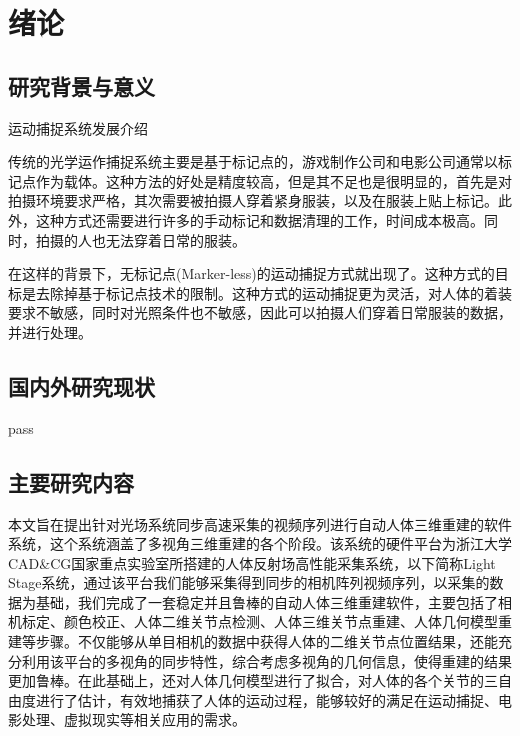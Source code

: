 
\section{绪论}

\subsection{研究背景与意义}
运动捕捉系统发展介绍

传统的光学运作捕捉系统主要是基于标记点的，游戏制作公司和电影公司通常以标记点作为载体。这种方法的好处是精度较高，但是其不足也是很明显的，首先是对拍摄环境要求严格，其次需要被拍摄人穿着紧身服装，以及在服装上贴上标记。此外，这种方式还需要进行许多的手动标记和数据清理的工作，时间成本极高。同时，拍摄的人也无法穿着日常的服装。

在这样的背景下，无标记点(Marker-less)的运动捕捉方式就出现了。这种方式的目标是去除掉基于标记点技术的限制。这种方式的运动捕捉更为灵活，对人体的着装要求不敏感，同时对光照条件也不敏感，因此可以拍摄人们穿着日常服装的数据，并进行处理。


\subsection{国内外研究现状}
pass

\subsection{主要研究内容}
本文旨在提出针对光场系统同步高速采集的视频序列进行自动人体三维重建的软件系统，这个系统涵盖了多视角三维重建的各个阶段。该系统的硬件平台为浙江大学CAD\&CG国家重点实验室所搭建的人体反射场高性能采集系统，以下简称Light Stage系统，通过该平台我们能够采集得到同步的相机阵列视频序列，以采集的数据为基础，我们完成了一套稳定并且鲁棒的自动人体三维重建软件，主要包括了相机标定、颜色校正、人体二维关节点检测、人体三维关节点重建、人体几何模型重建等步骤。不仅能够从单目相机的数据中获得人体的二维关节点位置结果，还能充分利用该平台的多视角的同步特性，综合考虑多视角的几何信息，使得重建的结果更加鲁棒。在此基础上，还对人体几何模型进行了拟合，对人体的各个关节的三自由度进行了估计，有效地捕获了人体的运动过程，能够较好的满足在运动捕捉、电影处理、虚拟现实等相关应用的需求。 